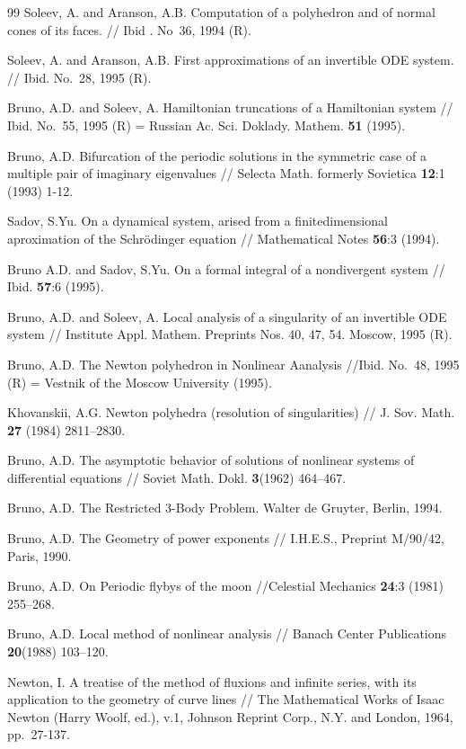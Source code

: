 \begin{thebibliography}{99}
 Soleev, A. and Aranson, A.B. Computation of a polyhedron and of
 normal cones of its faces. // Ibid . No~36,  1994 (R).

 Soleev, A. and Aranson, A.B. First approximations of an invertible ODE
  system. // Ibid. No.~28,  1995 (R).


  Bruno, A.D. and  Soleev, A. Hamiltonian truncations of a Hamiltonian system
// Ibid. No.~55, 1995 (R) = Russian Ac. Sci. Doklady. Mathem. {\bf 51} (1995). 

  Bruno, A.D.  Bifurcation of the periodic solutions in the  symmetric  case
         of a multiple pair of  imaginary  eigenvalues // Selecta  Math.
         formerly Sovietica {\bf 12}:1 (1993) 1-12.


  Sadov, S.Yu. On a dynamical system, arised from a
  finitedimensional aproximation of the Schr\"odinger equation // Mathematical
  Notes {\bf 56}:3 (1994).

  Bruno A.D. and Sadov, S.Yu. On a formal integral of a nondivergent system
  // Ibid. {\bf 57}:6 (1995).

  Bruno, A.D. and  Soleev, A.  Local analysis of a singularity of an
invertible ODE system // Institute Appl. Mathem. Preprints Nos. 40, 47, 54. 
 Moscow,
  1995 (R).


  Bruno, A.D. The Newton polyhedron in Nonlinear Aanalysis //Ibid.
  No.~48, 1995 (R) = Vestnik of the Moscow University (1995).

   Khovanskii, A.G. Newton polyhedra (resolution of singularities) // J.
   Sov. Math. {\bf 27} (1984) 2811--2830.

  Bruno, A.D. The asymptotic behavior of solutions of nonlinear systems
  of differential equations // Soviet Math. Dokl. {\bf 3}(1962) 464--467.

  Bruno, A.D. The Restricted 3-Body Problem. Walter de Gruyter, Berlin, 1994.

  Bruno, A.D. The Geometry of power exponents // I.H.E.S., Preprint M/90/42,
  Paris, 1990.

  Bruno, A.D. On Periodic flybys of the moon //Celestial Mechanics {\bf 24}:3
  (1981) 255--268.

  Bruno, A.D. Local method of nonlinear analysis // Banach Center
  Publications {\bf 20}(1988) 103--120.

  Newton, I. A treatise of the method of fluxions and infinite series, with
its application to the geometry of curve lines // The Mathematical Works of
Isaac Newton (Harry Woolf, ed.), v.1, Johnson Reprint Corp., N.Y. and London,
1964, pp.~27-137.

\end{thebibliography}


